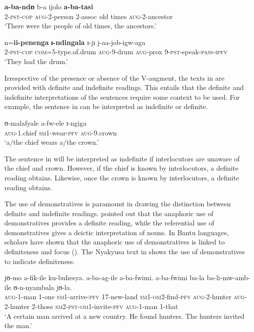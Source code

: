 \documentclass[output=paper]{langscibook}
\begin{document}
\ea%
    \label{ex:lusekelo:15}
\ea {}  \textbf{a-ba-ndʊ}  {b-a}  {ijolo}  \textbf{a-ba-tasi}\\
  2-\textsc{pst}-\textsc{cop}  \textsc{aug}-2-person  2-assoc  old times  \textsc{aug}-2-ancestor\\
\glt  ‘There were the people of old times, the ancestors.’

\ex {}  n=\textbf{ii-penenga}  \textbf{ɪ-ndingala}  {ɪ-jɪ}  {j-aa-job-igw-aga}\\
  2-\textsc{pst}-\textsc{cop}  \textsc{com}=5-type.of.drum  \textsc{aug}-9-drum  \textsc{aug}-prox  9-\textsc{pst}-speak-\textsc{pass}-\textsc{ipfv}\\
\glt  ‘They had the drum.’ \citep[352]{Persohn2017}
\z
\z

Irrespective of the presence or absence of the V-aug\-ment, the texts in \citet{Persohn2017} are provided with definite and indefinite readings. This entails that the definite and indefinite interpretations of the sentences require some context to be used. For example, the sentence in  can be interpreted as indefinite or definite. 

\ea%
    \label{ex:lusekelo:16}
\gll   ʊ{}-malafyale  a-fw-ele    ɪ{}-ngiga \\
  \textsc{aug}-1.chief  \textsc{sm}1-wear-\textsc{pfv}  \textsc{aug}-9.crown    \\
\glt  ‘a/the chief wears a/the crown.’
\z

The sentence in  will be interpreted as indefinite if interlocutors are unaware of the chief and crown. However, if the chief is known by interlocutors, a definite reading obtains. Likewise, once the crown is known by interlocutors, a definite reading obtains. 

The use of demonstratives is paramount in drawing the distinction between definite and indefinite readings. \citet{Lyons1999} pointed out that the anaphoric use of demonstratives provides a definite reading, while the referential use of demonstratives gives a deictic interpretation of nouns. In Bantu languages, scholars have shown that the anaphoric use of demonstratives is linked to definiteness and focus (\citealt{Visser2010, Asiimwe2014, Ndomba2017, Kimambo2018a}). The Nyakyusa text in  shows the use of demonstratives to indicate definiteness. 

\ea%
    \label{ex:lusekelo:18}
      {jʊ-mo}  {a-fik-ile}  {ku-buhesya.}  {a-ba-ag-ile} {a-ba-fwimi.}  {a-ba-fwimi}  {ba-la}  {ba-li-mw-amb-ile} {ʊ-n-nyambala}  {jʊ{}-la.}\\
  \textsc{aug-1}{}-man  1-one  \textsc{sm1}{}-arrive-\textsc{pfv}  17-new-land  \textsc{sm1-om2}{}-find-\textsc{pfv} \textsc{aug-2-}hunter  \textsc{aug-2-}hunter  2-those  \textsc{sm2-\textsc{pst}-om1}{}-invite-\textsc{pfv}    \textsc{aug-1}{}-man  1-that  \\
  \glt ‘A certain man arrived at a new country. He found hunters. The hunters   invited the man.’  
\z
\end{document}
